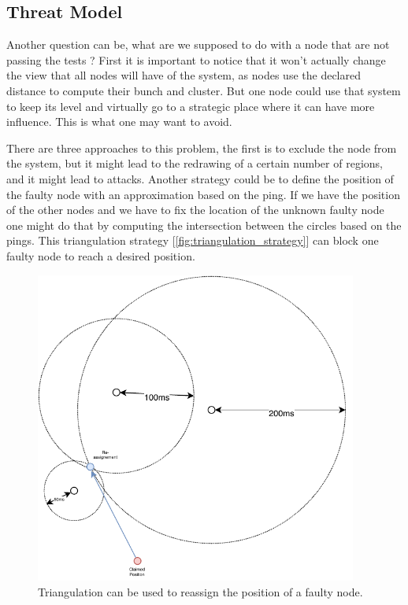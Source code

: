 \documentclass[a4paper,11pt,oneside]{report}
\begin{document}
\subsection{Threat Model}
Another question can be, what are we supposed to do with a node that are not
passing the tests ? First it is important to notice that it won't actually
change the view that all nodes will have of the system, as nodes use the
declared distance to compute their bunch and cluster. But one node could use
that system to keep its level and virtually go to a strategic place where it can have
more influence. This is what one may want to avoid. 

There are three approaches to this problem, the first is to exclude the node
from the system, but it might lead to the redrawing of a certain number of
regions, and it might lead to attacks. Another strategy could be to define the
position of the faulty node with an approximation based on the ping. If we have
the position of the other nodes and we have to fix the location of the unknown
faulty node one might do that by computing the intersection between the circles
based on the pings. This triangulation strategy [\autoref{fig:triangulation_strategy}] can block one faulty node to
reach a desired position. 

\begin{figure}[!h] 
\centering
\includegraphics[width=300pt]{figures/triangulation_strategy}
\caption{Triangulation can be used to reassign the position of a faulty node.  }
\label{fig:triangulation_strategy}
\end{figure}
\end{document}

